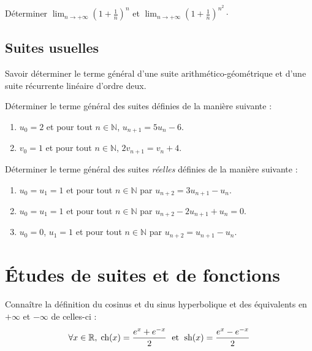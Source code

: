 \documentclass[a4paper,twoside,french,10pt]{VcCours}
\begin{document}
\medskip

\begin{Exercice}{}\end{Exercice} Déterminer $\lim_{n \rightarrow + \infty} \left( 1+ \frac{1}{n} \right)^n$ et $\lim_{n \rightarrow + \infty} \left( 1+ \frac{1}{n} \right)^{n^2}\cdot$



\subsection{Suites usuelles}

\begin{ptc}{}
	Savoir déterminer le terme général d'une suite arithmético-géométrique et d'une suite récurrente linéaire d'ordre deux.
\end{ptc}

\begin{Exercice}{}\end{Exercice} Déterminer le terme général des suites définies de la manière suivante :

\begin{enumerate}
 \item $u_0=2$ et pour tout $n \in \mathbb{N}$, $u_{n+1} = 5 u_n -6$. 
 \item $v_0=1$ et pour tout $n \in \mathbb{N}$, $2v_{n+1}= v_n+ 4$.
\end{enumerate}

\medskip

\begin{Exercice}{}\end{Exercice}
Déterminer le terme général des suites \textit{réelles} définies de la manière suivante :
\begin{enumerate}
\item $u_0=u_1=1$ et pour tout $n \in \mathbb{N}$ par $u_{n+2}=3u_{n+1}-u_n$.
\item $u_0=u_1=1$ et pour tout $n \in \mathbb{N}$ par $u_{n+2}-2u_{n+1}+u_n=0$.
\item $u_0=0$, $u_1=1$ et pour tout $n \in \mathbb{N}$ par $u_{n+2}=u_{n+1}-u_n$.
\end{enumerate}

\bigskip

\section{Études de suites et de fonctions}

\begin{ptc}{}
	Connaître la définition du cosinus et du sinus hyperbolique et des équivalents en $+ \infty$ et $- \infty$ de celles-ci :
$$ \forall x \in \mathbb{R}, \; \textrm{ch}(x) = \dfrac{e^x+e^{-x}}{2} \; \hbox{ et } \; \textrm{sh}(x) = \dfrac{e^x-e^{-x}}{2}$$
\end{ptc}
\end{document}
